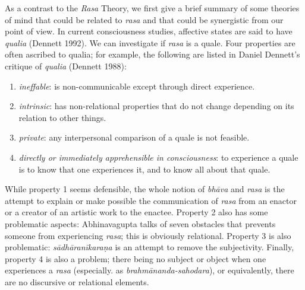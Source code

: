 As a contrast to the \textsl{Rasa} Theory, we first give a brief summary of some theories of mind that could be related to \textsl{rasa} and that could be synergistic from our point of view. In current consciousness studies, affective states are said to have \textsl{qualia} (Dennett 1992). We can investigate if \textsl{rasa} is a quale. Four properties are often ascribed to qualia; for example, the following are listed in Daniel Dennett's critique of \textsl{qualia} (Dennett 1988): 
\begin{enumerate}
\item \textsl{ineffable}: is non-communicable except through direct experience.
\item \textsl{intrinsic}: has non-relational properties that do not change depending on its relation to other things.
\item \textsl{private}: any interpersonal comparison of a quale is not feasible.
\item  \textsl{directly or immediately apprehensible in consciousness}: to experience a quale is to know that one experiences it, and to know all about that quale.
\end{enumerate}

While property 1 seems defensible, the whole notion of \textsl{bhāva} and \textsl{rasa} is the attempt to explain or make possible the communication of \textsl{rasa} from an enactor or a creator of an artistic work to the enactee. Property 2 also has some problematic aspects: Abhinavagupta talks of seven obstacles that prevents someone from experiencing \textsl{rasa}; this is obviously relational. Property 3 is also problematic: \textsl{sādhāranīkaraṇa} is an attempt to remove the subjectivity. Finally, property 4 is also a problem; there being no subject or object when one experiences a \textsl{rasa} (especially. as \textsl{brahmānanda-sahodara}), or equivalently, there are no discursive or relational elements.

